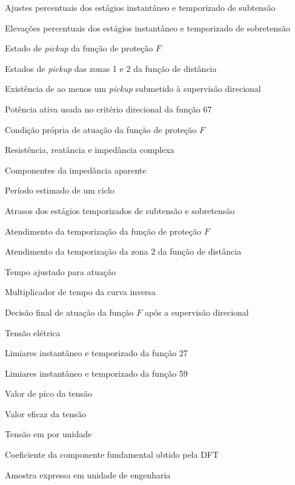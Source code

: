 \documentclass[
  12pt,
  oneside,
  a4paper,
  brazil,
  sumario=tradicional
]{abntex2}
\begin{document}
\begin{simbolos}
  \item[$p_{27,i}$, $p_{27,t}$] Ajustes percentuais dos estágios instantâneo e temporizado de subtensão
  \item[$p_{59,i}$, $p_{59,t}$] Elevações percentuais dos estágios instantâneo e temporizado de sobretensão
  \item[$P_F$] Estado de \textit{pickup} da função de proteção $F$
  \item[$P_{Z1}$, $P_{Z2}$] Estados de \textit{pickup} das zonas 1 e 2 da função de distância
  \item[$P_{\Sigma}$] Existência de ao menos um \textit{pickup} submetido à supervisão direcional
  \item[$P_{67}$] Potência ativa usada no critério direcional da função 67
  \item[$\operatorname{op}_F$] Condição própria de atuação da função de proteção $F$
  \item[$R$, $X$, $Z$] Resistência, reatância e impedância complexa
  \item[$R_{\mathrm{app}}$, $X_{\mathrm{app}}$] Componentes da impedância aparente
  \item[$T_c$] Período estimado de um ciclo
  \item[$T_{27}$, $T_{59}$] Atrasos dos estágios temporizados de subtensão e sobretensão
  \item[$T_F$] Atendimento da temporização da função de proteção $F$
  \item[$T_{Z2}$] Atendimento da temporização da zona 2 da função de distância
  \item[$T_{\mathrm{ajuste}}$] Tempo ajustado para atuação
  \item[$TMS$] Multiplicador de tempo da curva inversa
  \item[$\operatorname{trip}_F$] Decisão final de atuação da função $F$ após a supervisão direcional
  \item[$V$] Tensão elétrica
  \item[$V_{27,i}$, $V_{27,t}$] Limiares instantâneo e temporizado da função 27
  \item[$V_{59,i}$, $V_{59,t}$] Limiares instantâneo e temporizado da função 59
  \item[$V_m$] Valor de pico da tensão
  \item[$V_{\mathrm{rms}}$] Valor eficaz da tensão
  \item[$V_{pu}$] Tensão em por unidade
  \item[$X_1$] Coeficiente da componente fundamental obtido pela DFT
  \item[$x_{\mathrm{eng}}$] Amostra expressa em unidade de engenharia

\end{simbolos}
\end{document}
